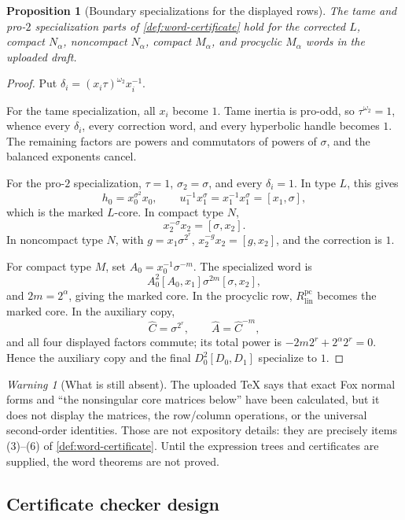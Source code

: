 \documentclass[11pt,reqno]{amsart}
\newtheorem{proposition}[theorem]{Proposition}
\theoremstyle{remark}
\newtheorem{warning}[theorem]{Warning}
\numberwithin{equation}{section}
\newcommand{\pc}{\mathrm{pc}}
\begin{document}
\begin{proposition}[Boundary specializations for the displayed rows]
\label{prop:word-boundary}
The tame and pro-\(2\) specialization parts of
\cref{def:word-certificate} hold for the corrected \(L\), compact
\(N_\alpha\), noncompact \(N_\alpha\), compact \(M_\alpha\), and
procyclic \(M_\alpha\) words in the uploaded draft.
\end{proposition}

\begin{proof}
Put \(\delta_i=(x_i\tau)^{\omega_2}x_i^{-1}\).

For the tame specialization, all \(x_i\) become \(1\).  Tame inertia is
pro-odd, so \(\tau^{\omega_2}=1\), whence every \(\delta_i\), every
correction word, and every hyperbolic handle becomes \(1\).  The remaining
factors are powers and commutators of powers of \(\sigma\), and the
balanced exponents cancel.

For the pro-\(2\) specialization, \(\tau=1\),
\(\sigma_2=\sigma\), and every \(\delta_i=1\).  In type \(L\), this gives
\[
 h_0=x_0^{\sigma^2}x_0,
 \qquad u_1^{-1}x_1^\sigma=x_1^{-1}x_1^\sigma=[x_1,\sigma],
\]
which is the marked \(L\)-core.  In compact type \(N\),
\[
 x_2^{-\sigma}x_2=[\sigma,x_2].
\]
In noncompact type \(N\), with \(g=x_1\sigma^{2^r}\),
\(x_2^{-g}x_2=[g,x_2]\), and the correction is \(1\).

For compact type \(M\), set \(A_0=x_0^{-1}\sigma^{-m}\).  The specialized
word is
\[
 A_0^2[A_0,x_1]\sigma^{2m}[\sigma,x_2],
\]
and \(2m=2^\alpha\), giving the marked core.  In the procyclic row,
\(R_{\mathrm{lin}}^{\pc}\) becomes the marked core.  In the auxiliary
copy,
\[
 \widehat C=\sigma^{2^r},\qquad
 \widehat A=\widehat C^{-m},
\]
and all four displayed factors commute; its total power is
\(-2m2^r+2^\alpha2^r=0\).  Hence the auxiliary copy and the final
\(D_0^2[D_0,D_1]\) specialize to \(1\).
\end{proof}

\begin{warning}[What is still absent]
The uploaded TeX says that exact Fox normal forms and ``the nonsingular
core matrices below'' have been calculated, but it does not display the
matrices, the row/column operations, or the universal second-order
identities.  Those are not expository details: they are precisely items
(3)--(6) of \cref{def:word-certificate}.  Until the expression trees and
certificates are supplied, the word theorems are not proved.
\end{warning}

\subsection{Certificate checker design}
\end{document}
